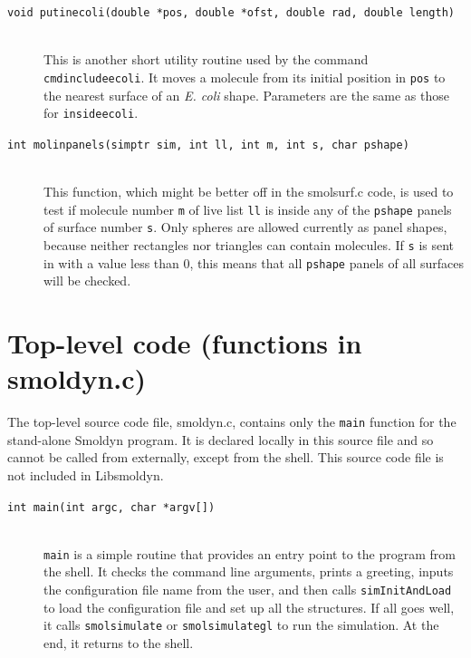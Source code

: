 \documentclass {scrbook}
\newcommand {\ttt} {\texttt}
\begin{document}
\begin{description}
\item[\ttt{void putinecoli(double *pos, double *ofst, double rad, double length)}]
\hfill \\
This is another short utility routine used by the command \ttt{cmdincludeecoli}. It moves a molecule from its initial position in \ttt{pos} to the nearest surface of an \emph{E. coli} shape. Parameters are the same as those for \ttt{insideecoli}.

\item[\ttt{int molinpanels(simptr sim, int ll, int m, int s, char pshape)}]
\hfill \\
This function, which might be better off in the smolsurf.c code, is used to test if molecule number \ttt{m} of live list \ttt{ll} is inside any of the \ttt{pshape} panels of surface number \ttt{s}. Only spheres are allowed currently as panel shapes, because neither rectangles nor triangles can contain molecules. If \ttt{s} is sent in with a value less than 0, this means that all \ttt{pshape} panels of all surfaces will be checked.

\end{description}

\section{Top-level code (functions in smoldyn.c)}

The top-level source code file, smoldyn.c, contains only the \ttt{main} function for the stand-alone Smoldyn program. It is declared locally in this source file and so cannot be called from externally, except from the shell. This source code file is not included in Libsmoldyn.

\begin{description}

\item[\ttt{int main(int argc, char *argv[])}]
\hfill \\
\ttt{main} is a simple routine that provides an entry point to the program from the shell. It checks the command line arguments, prints a greeting, inputs the configuration file name from the user, and then calls \ttt{simInitAndLoad} to load the configuration file and set up all the structures. If all goes well, it calls \ttt{smolsimulate} or \ttt{smolsimulategl} to run the simulation. At the end, it returns to the shell.

\end{description}
\end{document}
